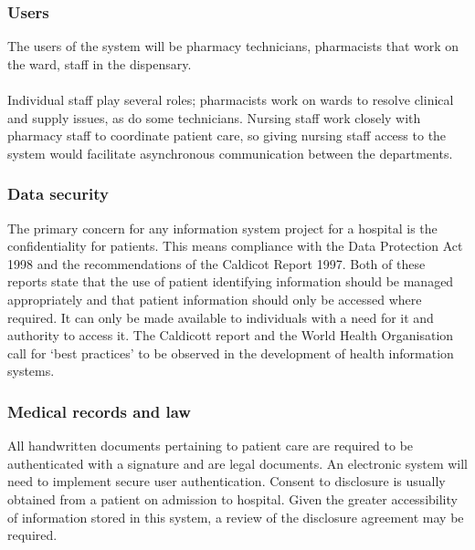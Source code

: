 \documentclass[letterpaper]{amsart}
\begin{document}
\subsubsection{Users} The users of the system will be pharmacy technicians, pharmacists that work on the ward, staff in the dispensary.  
\paragraph{ } Individual staff play several roles; pharmacists work on wards to resolve clinical and supply issues, as do some technicians. Nursing staff work closely with pharmacy staff to coordinate patient care, so giving nursing staff access to the system would facilitate asynchronous communication between the departments.  
\subsubsection{Data security} The primary concern for any information system project for a hospital is the confidentiality for patients.  This means compliance with the Data Protection Act 1998 and the recommendations of the Caldicot Report 1997.\cite{Caldicott}  Both of these reports state that the use of patient identifying information should be managed appropriately and that patient information should only be accessed where required. It can only be made available to individuals with a need for it and authority to access it. The Caldicott report and the World Health Organisation call for `best practices' to be observed in the development of health information systems\cite{whosec}.
\subsubsection{Medical records and law } All handwritten documents pertaining to patient care are required to be authenticated with a signature and are legal documents.  An electronic system will need to implement secure user authentication.  Consent to disclosure is usually obtained from a patient on admission to hospital. Given the greater accessibility of information stored in this system, a review of the disclosure agreement may be required.
\end{document}

